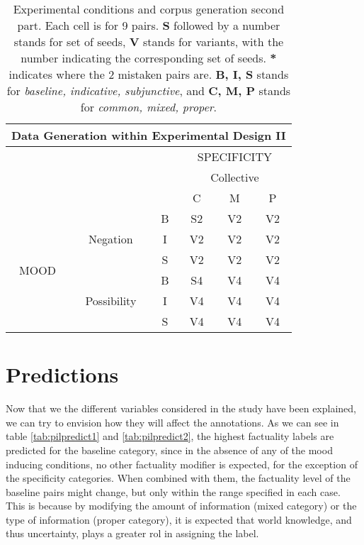 \begin{table}[h!]
\centering
\begin{tabular}{|c|c|c|c|c|c|}
\hline
\multicolumn{6}{|c|}{Data Generation within Experimental Design II}\\\hline
                      & & &\multicolumn{3}{c|}{SPECIFICITY} \\\cline{4-6} 
                      & & & \multicolumn{3}{c|}{Collective}\\\cline{4-6} 
                      & & & C & M & P \\\hline 
\multirow{6}{*}{MOOD} & \multirow{3}{*}{Negation} & B &S2 &V2 &V2\\\cline{3-6}
                      &                           & I & V2 &V2 &V2\\\cline{3-6}
                      &                           & S &V2 &V2 &V2\\ \cline{2-6}\cline{2-6}                     
                      &\multirow{3}{*}{Possibility}& B&S4 &V4 &V4\\\cline{3-6}
                      &                           & I & V4 & V4 & V4\\\cline{3-6}
                      &                           & S  & V4 & V4 & V4\\\hline                                                          
\end{tabular}
\caption[Experimental conditions and corpus generation II.]{Experimental conditions and corpus generation second part. Each cell is for 9 pairs. \textbf{S} followed by a number stands for set of seeds, \textbf{V} stands for variants, with the number indicating the corresponding set of seeds. \textbf{*} indicates where the 2 mistaken pairs are. \textbf{B, I, S} stands for \textit{baseline, indicative, subjunctive}, and \textbf{C, M, P} stands for \textit{common, mixed, proper}.}
\label{tab:datagen2}
\end{table}
\section{Predictions}
Now that we the different variables considered in the study have been explained, we can try to envision how they will affect the annotations. As we can see in table \ref{tab:pilpredict1} and \ref{tab:pilpredict2}, the highest factuality labels are predicted for the baseline category, since in the absence of any of the mood inducing conditions, no other factuality modifier is expected, for the exception of the specificity categories. When combined with them, the factuality level of the baseline pairs might change, but only within the range specified in each case. This is because by modifying the amount of information (mixed category) or the type of information (proper category), it is expected that world knowledge, and thus uncertainty, plays a greater rol in assigning the label. \\

